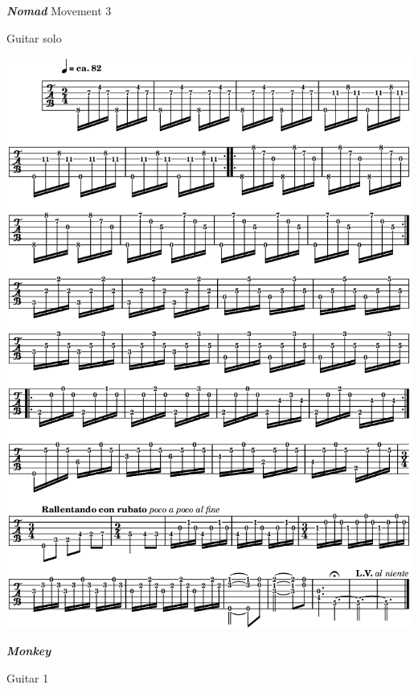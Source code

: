 \newpage

 \textbf{\textsl{Nomad}} Movement 3 

\smallskip

 \quad Guitar solo

\begin{center}
\includegraphics[width=\textwidth]{img/neC1}
\end{center}

\newpage

\textbf{\textsl{Monkey}}  

\smallskip

 \quad Guitar 1


